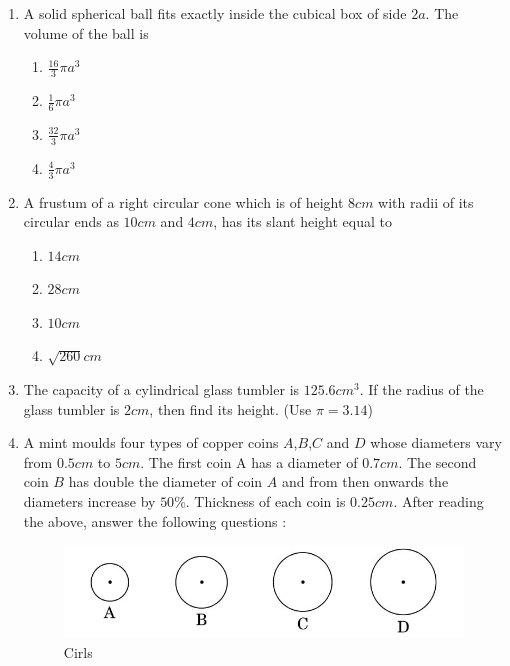 \begin{enumerate}
    \item A solid spherical ball fits exactly inside the cubical box of side $2a$. The volume of the ball is 
\begin{enumerate}
    \item $\frac{16}{3}\pi a^3$
    \item $\frac{1}{6}\pi a^3$
    \item $\frac{32}{3}\pi a^3$
        \item $\frac{4}{3}\pi a^3$
    \end{enumerate}
    
    \item A frustum of a right circular cone which is of height $8 cm$ with radii of its circular ends as $10 cm$ and $4 cm$, has its slant height equal to 
\begin{enumerate}
    \item $ 14 cm$
    \item $28 cm$
    \item $10 cm$
    \item $\sqrt{260}cm$
    \end{enumerate}
    
    \item The capacity of a cylindrical glass tumbler is $125.6 cm^3$. If the radius of the glass tumbler is $2 cm$, then find its height. (Use $\pi= 3.14$)

\item A mint moulds four types of copper coins $A$,$B$,$C$ and $D$ whose diameters vary from $0.5 cm$ to $5 cm$. The first coin A has a diameter of $0.7 cm$. The second coin $B$ has double the diameter of coin $A$ and from then onwards the diameters increase by $50\%$. Thickness of each coin is $0.25 cm$.
    After reading the above, answer the following questions :
\begin{figure}[H]
    \centering
    \includegraphics[width=\columnwidth]{figs/cirls1.png}
    \caption{Cirls}
    \label{fig:fig1}
    \end{figure}
      

\end{enumerate}
